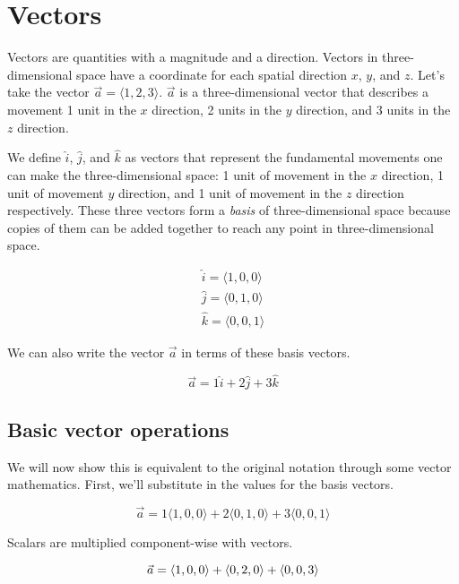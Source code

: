 \section{Vectors}

Vectors are quantities with a magnitude and a direction. Vectors in
three-dimensional space have a coordinate for each spatial direction $x$, $y$,
and $z$. Let's take the vector $\vec{a} = \langle 1, 2, 3 \rangle$. $\vec{a}$ is
a three-dimensional vector that describes a movement 1 unit in the $x$
direction, 2 units in the $y$ direction, and 3 units in the $z$ direction.

We define $\hat{i}$, $\hat{j}$, and $\hat{k}$ as vectors that represent the
fundamental movements one can make the three-dimensional space: 1 unit of
movement in the $x$ direction, 1 unit of movement $y$ direction, and 1 unit of
movement in the $z$ direction respectively. These three vectors form a
\textit{basis} of three-dimensional space because copies of them can be added
together to reach any point in three-dimensional space.

\begin{align*}
  \hat{i} = \langle 1, 0, 0 \rangle \\
  \hat{j} = \langle 0, 1, 0 \rangle \\
  \hat{k} = \langle 0, 0, 1 \rangle
\end{align*}

We can also write the vector $\vec{a}$ in terms of these basis vectors.

\begin{equation*}
  \vec{a} = 1\hat{i} + 2\hat{j} + 3\hat{k}
\end{equation*}

\subsection{Basic vector operations}

We will now show this is equivalent to the original notation through some vector
mathematics. First, we'll substitute in the values for the basis vectors.

\begin{equation*}
  \vec{a} = 1\langle 1, 0, 0 \rangle + 2\langle 0, 1, 0 \rangle +
    3\langle 0, 0, 1 \rangle
\end{equation*}

Scalars are multiplied component-wise with vectors.

\begin{equation*}
  \vec{a} = \langle 1, 0, 0 \rangle + \langle 0, 2, 0 \rangle +
    \langle 0, 0, 3 \rangle \\
\end{equation*}


